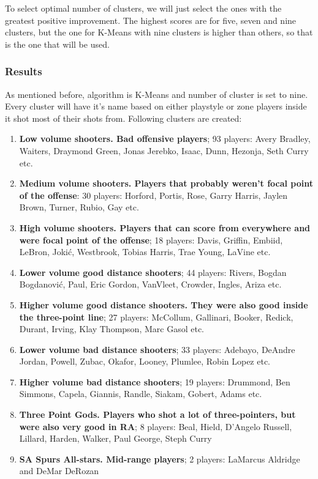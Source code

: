 \documentclass[a4paper]{article}
\begin{document}
To select optimal number of clusters, we will just select the ones with the greatest positive improvement. The highest scores are for five, seven and nine clusters, but the one for K-Means with nine clusters is higher than others, so that is the one that will be used.

\subsubsection{Results}
\label{subsubsec:clust_shooters_results}

As mentioned before, algorithm is K-Means and number of cluster is set to nine. Every cluster will have it's name based on either playstyle or zone players inside it shot most of their shots from. Following clusters are created:


\begin{enumerate}
	\item \textbf{Low volume shooters. Bad offensive players}; 93 players: Avery Bradley, Waiters, Draymond Green, Jonas Jerebko, Isaac, Dunn, Hezonja, Seth Curry etc.
	\item \textbf{Medium volume shooters. Players that probably weren't focal point of the offense}:  30 players: Horford, Portis, Rose, Garry Harris, Jaylen Brown, Turner, Rubio, Gay etc.
	\item \textbf{High volume shooters. Players that can score from everywhere and were focal point of the offense}; 18 players: Davis, Griffin, Embiid, LeBron, Jokić, Westbrook, Tobias Harris, Trae Young, LaVine etc.
	\item \textbf{Lower volume good distance shooters}; 44 players: Rivers, Bogdan Bogdanović, Paul, Eric Gordon, VanVleet, Crowder, Ingles, Ariza etc.
	\item \textbf{Higher volume good distance shooters. They were also good inside the three-point line}; 27 players: McCollum, Gallinari, Booker, Redick, Durant, Irving, Klay Thompson, Marc Gasol etc.
	\item \textbf{Lower volume bad distance shooters}; 33 players: Adebayo, DeAndre Jordan, Powell, Zubac, Okafor, Looney, Plumlee, Robin Lopez etc.
	\item \textbf{Higher volume bad distance shooters}; 19 players: Drummond, Ben Simmons, Capela, Giannis, Randle, Siakam, Gobert, Adams etc.
	\item \textbf{Three Point Gods. Players who shot a lot of three-pointers, but were also very good in RA}; 8 players: Beal, Hield, D'Angelo Russell, Lillard, Harden, Walker, Paul George, Steph Curry 
	\item \textbf{SA Spurs All-stars. Mid-range players}; 2 players: LaMarcus Aldridge and DeMar DeRozan
\end{enumerate}
\end{document}
